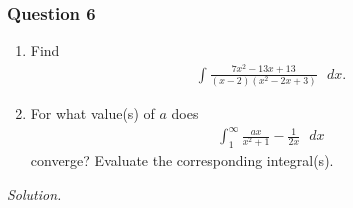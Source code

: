 \documentclass[12pt]{article}
\begin{document}
\subsubsection*{Question 6}
\begin{enumerate}[label=\textbf{(\alph*)}]
    \itemsep 0em
    \item Find \begin{align*}
        \int\frac{7x^2-13x+13}{\left(x-2\right)\left(x^2-2x+3\right)}\text{ }dx.
    \end{align*}
    \item For what value(s) of $a$ does \begin{align*}
        \int_{1}^{\infty}\frac{ax}{x^2+1}-\frac{1}{2x}\text{ }dx
    \end{align*}
    converge? Evaluate the corresponding integral(s).
\end{enumerate}
\textit{Solution.}
\end{document}
